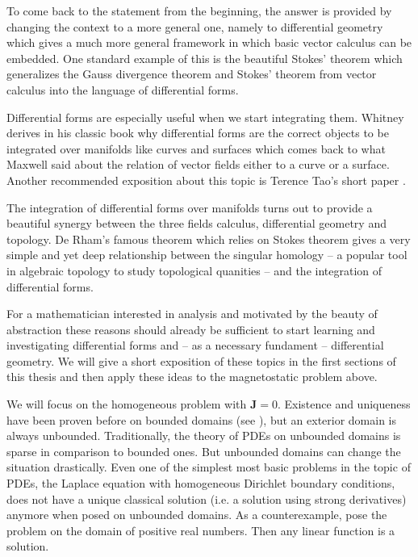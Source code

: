 \documentclass[../master_thesis.tex]{subfiles}
\begin{document}
To come back to the statement from the beginning, the answer is provided 
by changing the context to a more general one, namely to differential geometry which
gives a much more general framework in which basic vector calculus can 
be embedded. One standard example of this is the beautiful Stokes' theorem 
which generalizes the Gauss divergence theorem and Stokes' theorem from vector calculus 
into the language of differential forms.

Differential forms are especially useful when we start integrating them. 
Whitney derives in his classic book \cite{whitney} why differential forms are
the correct objects to be integrated over manifolds like curves and surfaces which comes back 
to what Maxwell said about the relation 
of vector fields either to a curve or a surface. 
Another recommended exposition about this topic is Terence Tao's short paper \cite{terence_tao}. 

The integration of differential forms over manifolds turns out to provide 
a beautiful synergy between the three fields 
calculus, differential geometry and topology. De Rham's famous theorem which 
relies on Stokes theorem 
gives a very simple and yet deep relationship between the singular homology -- 
a popular tool in algebraic topology to study topological quanities -- 
and the integration of differential forms.

For a mathematician interested in analysis and motivated by the beauty of abstraction 
these reasons should already be sufficient to start learning and investigating 
differential forms and -- as a necessary fundament -- differential geometry. We will 
give a short exposition of these topics in the first sections of this thesis 
and then apply these ideas to the magnetostatic problem above.

We will focus on the homogeneous problem with $\mathbf{J} = 0$.
Existence and uniqueness have been proven before on bounded domains 
(see \cite[Thm.\,5.4]{mitrea_layer_potentials}),
but an exterior domain is always unbounded. 
Traditionally, the theory of PDEs on unbounded domains 
is sparse in comparison to bounded ones. But unbounded domains can change the 
situation drastically. Even one of the simplest most basic problems in the topic 
of PDEs, the Laplace equation with homogeneous Dirichlet boundary conditions, does not 
have a unique classical solution (i.e. a solution using strong derivatives) 
anymore when posed on unbounded domains. As a counterexample,
pose the problem on the domain of positive real numbers. Then any linear function 
is a solution.
\end{document}
